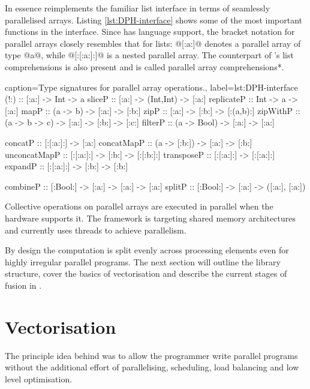\documentclass[preamble.tex]{subfiles}
\begin{document}
In essence \DPH reimplements the familiar list interface in terms of seamlessly parallelised arrays. Listing \ref{lst:DPH-interface} shows some of the most important functions in the \DPH interface. Since \DPH has language support, the bracket notation for parallel arrays closely resembles that for \Haskell lists: @[:a:]@ denotes a parallel array of type @a@, while @[:[:a:]:]@ is a nested parallel array. The counterpart of \Haskell's list comprehensions is also present and is called \*parallel array comprehensions*.


\begin{hscode2}{%
	caption={Type signatures for parallel array operations.},%
	label=lst:DPH-interface}
(!:)         :: [:a:] -> Int -> a
sliceP       :: [:a:] -> (Int,Int) -> [:a:]
replicateP   :: Int -> a -> [:a:]
mapP         :: (a -> b) -> [:a:] -> [:b:]
zipP         :: [:a:] -> [:b:] -> [:(a,b):]
zipWithP     :: (a -> b -> c) -> [:a:] -> [:b:] -> [:c:]
filterP      :: (a -> Bool) -> [:a:] -> [:a:]

concatP      :: [:[:a:]:] -> [:a:]
concatMapP   :: (a -> [:b:]) -> [:a:] -> [:b:]
unconcatMapP :: [:[:a:]:] -> [:b:] -> [:[:b:]:]
transposeP   :: [:[:a:]:] -> [:[:a:]:]
expandP      :: [:[:a:]:] -> [:b:] -> [:b:]

combineP     :: [:Bool:] -> [:a:] -> [:a:] -> [:a:]
splitP       :: [:Bool:] -> [:a:] -> ([:a:], [:a:])
\end{hscode2}



Collective operations on parallel arrays are executed in parallel when the hardware supports it. The framework is targeting shared memory architectures and currently uses \Haskell threads \cite{Jones08atutorial} to achieve parallelism.

By design the computation is split evenly across processing elements even for highly irregular parallel programs. The next section will outline the library structure, cover the basics of vectorisation and describe the current stages of fusion in \DPH.



\section{Vectorisation}
\label{sec:Vectorisation}
\ivect{}

The principle idea behind \DPH was to allow the programmer write parallel programs without the additional effort of parallelising, scheduling, load balancing and low level optimisation.
\end{document}
